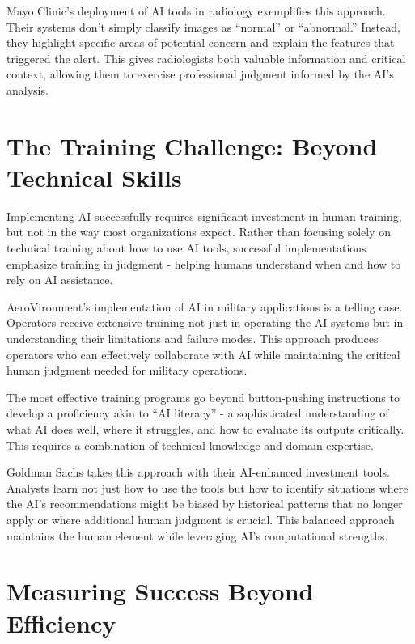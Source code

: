 \documentclass[
  Letterpaper,
]{scrbook}
\begin{document}
Mayo Clinic's deployment of AI tools in
radiology exemplifies this approach. Their systems
don't simply classify images as ``normal'' or ``abnormal.'' Instead,
they highlight specific areas of potential concern and explain the
features that triggered the alert. This gives radiologists both valuable
information and critical context, allowing them to exercise professional
judgment informed by the AI's analysis.

\section{The Training Challenge: Beyond Technical
Skills}\label{the-training-challenge-beyond-technical-skills}

Implementing AI successfully requires significant investment in human
training, but not in the way most organizations expect. Rather than
focusing solely on technical training about how to use AI tools,
successful implementations emphasize training in judgment - helping
humans understand when and how to rely on AI assistance.

AeroVironment's implementation of AI in military applications is a
telling case. Operators receive extensive training not just in operating
the AI systems but in understanding their limitations and failure modes.
This approach produces operators who can effectively collaborate with AI
while maintaining the critical human judgment needed for military
operations.

The most effective training programs go beyond button-pushing
instructions to develop a proficiency akin to ``AI
literacy'' - a sophisticated
understanding of what AI does well, where it struggles, and how to
evaluate its outputs critically. This requires a combination of
technical knowledge and domain expertise.

Goldman Sachs takes this approach with
their AI-enhanced investment tools. Analysts learn not just how to use
the tools but how to identify situations where the AI's recommendations
might be biased by historical patterns that no longer apply or where
additional human judgment is crucial. This balanced approach maintains
the human element while leveraging AI's computational strengths.

\section{Measuring Success Beyond
Efficiency}\label{measuring-success-beyond-efficiency}
\end{document}

